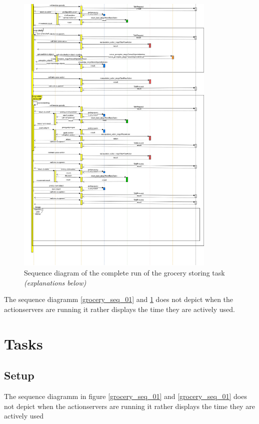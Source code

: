 \documentclass[main.tex]{subfiles}
\begin{document}
		\begin{figure}	
			\centering
			\includegraphics[width=0.85\textwidth]{pictures/diagramms/second-part-grocery-sequence.png}
			\caption{Sequence diagram of the complete run of the grocery storing task \textit{(explanations below)}}
			\label{grocery_seq_02}
		\end{figure}
	
	
		The sequence diagramm \ref{grocery_seq_01} and \ref{grocery_seq_02} does not depict when the actionservers are running it rather displays the time they are actively used.

	\section{Tasks}
	
	\subsection{Setup}
		The sequence diagramm in figure \ref{grocery_seq_01} and \ref{grocery_seq_01} does not depict when the actionservers are running it rather displays the time they are actively used	
	
\end{document}
